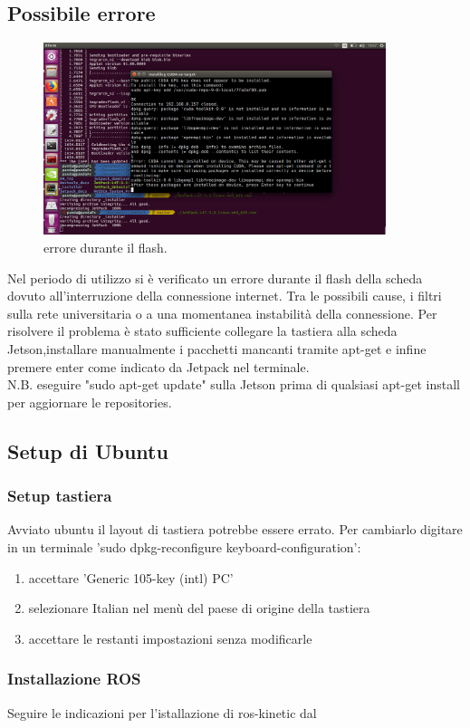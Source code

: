 \documentclass[a4paper]{article}
\begin{document}
\newpage
\subsection{Possibile errore}
\begin{figure}[h]
    \centering
    \includegraphics[width=10cm]{err1.png}    
    \caption{errore durante il flash.}
    \label{fig:err1}
\end{figure}
Nel periodo di utilizzo si è verificato un errore durante il flash della scheda dovuto all'interruzione della connessione internet. 
Tra le possibili cause, i filtri sulla rete universitaria o a una momentanea instabilità della connessione. Per risolvere il problema è stato sufficiente collegare la tastiera alla scheda Jetson,installare manualmente i pacchetti mancanti tramite apt-get e infine premere enter come indicato da Jetpack nel terminale.\\
N.B. eseguire "sudo apt-get update" sulla Jetson prima di qualsiasi apt-get install per aggiornare le repositories.

\subsection{Setup di Ubuntu}
\subsubsection{Setup tastiera}
Avviato ubuntu il layout di tastiera potrebbe essere errato. Per cambiarlo digitare in un terminale 'sudo dpkg-reconfigure keyboard-configuration':
\begin{enumerate}
    \item accettare 'Generic 105-key (intl) PC'
    \item selezionare Italian nel menù del paese di origine della tastiera
    \item accettare le restanti impostazioni senza modificarle
\end{enumerate}
\subsubsection{Installazione ROS}
Seguire le indicazioni per l'istallazione di ros-kinetic dal \href{http://wiki.ros.org/action/show/kinetic/Installation/Ubuntu?action=show&redirect=kinetic%2FInstallation%2FUbuntuARM}{\underline{\color{blue}{sito ufficiale per ubuntu ARM.}}}
\newpage
\end{document}
